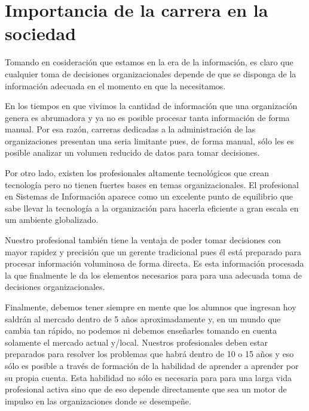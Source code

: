\section{Importancia de la carrera en la sociedad}\label{sec:importance-in-the-society}
Tomando en cosideración que estamos en la era de la información, es claro que cualquier 
toma de decisiones organizacionales depende de que se disponga 
de la información adecuada en el momento en que la necesitamos.

En los tiempos en que vivimos la cantidad de información que una organización genera 
es abrumadora y ya no es posible procesar tanta información de forma manual. 
Por esa razón, carreras dedicadas a la administración de las organizaciones 
presentan una seria limitante pues, de forma manual, sólo les es posible analizar 
un volumen reducido de datos para tomar decisiones. 

Por otro lado, existen los profesionales altamente tecnológicos que crean tecnología 
pero no tienen fuertes bases en temas organizacionales. El profesional en 
Sistemas de Información aparece como un excelente punto de equilibrio que sabe llevar la 
tecnología a la organización para hacerla eficiente a gran escala en um ambiente globalizado.

Nuestro profesional también tiene la ventaja de poder tomar decisiones con mayor rapidez y precisión 
que un gerente tradicional pues él está preparado para procesar información voluminosa de forma directa. 
Es esta información procesada la que finalmente le da los elementos necesarios para
para una adecuada toma de decisiones organizacionales.

Finalmente, debemos tener siempre en mente que los alumnos que ingresan hoy 
saldrán al mercado dentro de 5 años aproximadamente y, en un mundo que cambia tan rápido, 
no podemos ni debemos enseñarles tomando en cuenta solamente el mercado actual y/local. 
Nuestros profesionales deben estar preparados para resolver los problemas 
que habrá dentro de 10 o 15 años y eso sólo es posible a través de formación de la habilidad 
de aprender a aprender por su propia cuenta. Esta habilidad no sólo es necesaria para para una larga 
vida profesional activa sino que de eso depende directamente que sea un motor de impulso en las 
organizaciones donde se desempeñe.
